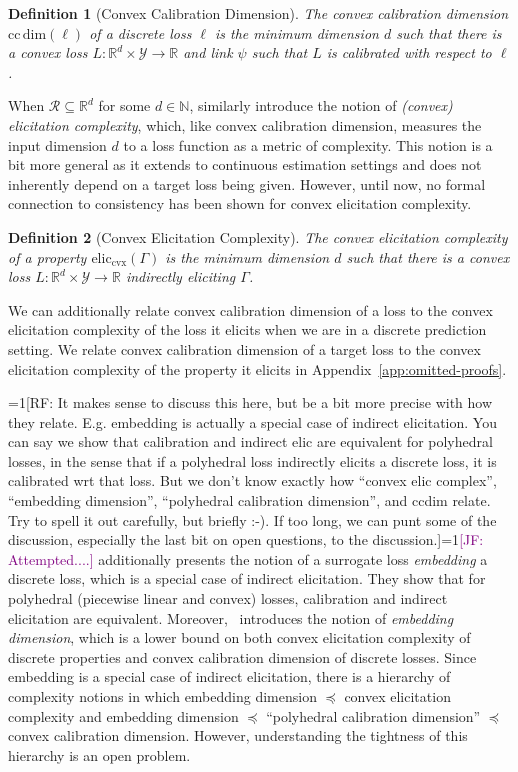 \documentclass{article}
\newcommand{\Comments}{1}
\newcommand{\mynote}[2]{\ifnum\Comments=1\textcolor{#1}{#2}\fi}
\newcommand{\raf}[1]{\mynote{green!80!blue}{[RF: #1]}}
\newcommand{\jessie}[1]{\mynote{purple}{[JF: #1]}}
\newcommand{\reals}{\mathbb{R}}
\newcommand{\eliccvx}{\mathrm{elic}_\mathrm{cvx}}
\newcommand{\ccdim}{\mathrm{cc\,dim}}
\newcommand{\R}{\mathcal{R}}
\newcommand{\Y}{\mathcal{Y}}
\newtheorem{definition}{Definition}
\begin{document}
\begin{definition}[Convex Calibration Dimension]
	The \emph{convex calibration dimension} $\ccdim(\ell)$ of a discrete loss $\ell$ is the minimum dimension $d$ such that there is a convex loss $L: \reals^d \times \Y \to \reals$ and link $\psi$ such that $L$ is calibrated with respect to $\ell$.
\end{definition}

When $\R \subseteq \reals^d$ for some $d \in \mathbb{N}$, \citet{frongillo2018elicitation} similarly introduce the notion of \emph{(convex) elicitation complexity}, which, like convex calibration dimension, measures the input dimension $d$ to a loss function as a metric of complexity.
This notion is a bit more general as it extends to continuous estimation settings and does not inherently depend on a target loss being given. 
However, until now, no formal connection to consistency has been shown for convex elicitation complexity.

\begin{definition}[Convex Elicitation Complexity]
	The \emph{convex elicitation complexity} of a property $\eliccvx(\Gamma)$ is the minimum dimension $d$ such that there is a convex loss $L : \reals^d \times \Y \to \reals$ indirectly eliciting $\Gamma$.
\end{definition}

We can additionally relate convex calibration dimension of a loss to the convex elicitation complexity of the loss it elicits when we are in a discrete prediction setting.
We relate convex calibration dimension of a target loss to the convex elicitation complexity of the property it elicits in Appendix~\ref{app:omitted-proofs}.

\raf{It makes sense to discuss this here, but be a bit more precise with how they relate.  E.g. embedding is actually a special case of indirect elicitation.  You can say we show that calibration and indirect elic are equivalent for polyhedral losses, in the sense that if a polyhedral loss indirectly elicits a discrete loss, it is calibrated wrt that loss.  But we don't know exactly how ``convex elic complex'', ``embedding dimension'', ``polyhedral calibration dimension'', and ccdim relate.  Try to spell it out carefully, but briefly :-).  If too long, we can punt some of the discussion, especially the last bit on open questions, to the discussion.}\jessie{Attempted....}
\citet{finocchiaro2019embedding} additionally presents the notion of a surrogate loss \emph{embedding} a discrete loss, which is a special case of indirect elicitation.
They show that for polyhedral (piecewise linear and convex) losses, calibration and indirect elicitation are equivalent.
Moreover,~\citet{finocchiaro2020embedding} introduces the notion of \emph{embedding dimension}, which is a lower bound on both convex elicitation complexity of discrete properties and convex calibration dimension of discrete losses.
Since embedding is a special case of indirect elicitation, there is a hierarchy of complexity notions in which embedding dimension $\preceq$ convex elicitation complexity and embedding dimension $\preceq$  ``polyhedral calibration dimension'' $\preceq$ convex calibration dimension.
However, understanding the tightness of this hierarchy is an open problem.
\end{document}
